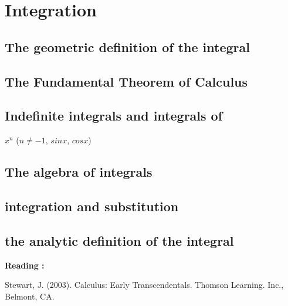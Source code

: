 \documentclass[]{book}
\begin{document}
\hypertarget{integration}{%
\section{Integration}\label{integration}}

\hypertarget{the-geometric-definition-of-the-integral}{%
\subsection{The geometric definition of the integral}\label{the-geometric-definition-of-the-integral}}

\hypertarget{the-fundamental-theorem-of-calculus}{%
\subsection{The Fundamental Theorem of Calculus}\label{the-fundamental-theorem-of-calculus}}

\hypertarget{indefinite-integrals-and-integrals-of}{%
\subsection{Indefinite integrals and integrals of}\label{indefinite-integrals-and-integrals-of}}

\(x^n\) (\(n\neq-1\), \(sin x\), \(cos x\))

\hypertarget{the-algebra-of-integrals}{%
\subsection{The algebra of integrals}\label{the-algebra-of-integrals}}

\hypertarget{integration-and-substitution}{%
\subsection{integration and substitution}\label{integration-and-substitution}}

\hypertarget{the-analytic-definition-of-the-integral}{%
\subsection{the analytic definition of the integral}\label{the-analytic-definition-of-the-integral}}

\textbf{Reading :}

Stewart, J. (2003). Calculus: Early Transcendentals. Thomson Learning. Inc., Belmont, CA.
\end{document}
